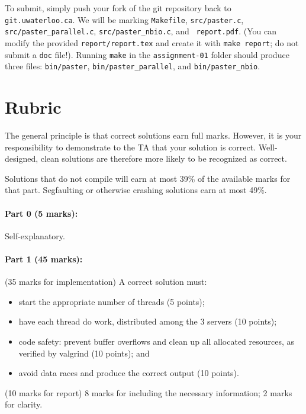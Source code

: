 \documentclass[letterpaper,10pt]{article}
\begin{document}
To submit, simply push your fork of the git repository back to {\tt git.uwaterloo.ca}.
We will
be marking {\tt Makefile}, {\tt src/paster.c}, {\tt
  src/paster\_parallel.c}, {\tt src/paster\_nbio.c}, and {\tt
  report.pdf}. (You can modify the provided {\tt report/report.tex}
and create it with {\tt make report}; do not submit a {\tt doc}
file!). Running {\tt make} in the {\tt assignment-01} folder should
produce three files: {\tt bin/paster}, {\tt bin/paster\_parallel}, and
{\tt bin/paster\_nbio}. 

\newpage

\section*{Rubric}
The general principle is that correct solutions earn full marks.
However, it is your responsibility to demonstrate to the TA
that your solution is correct. Well-designed, clean solutions 
are therefore more likely to be recognized as correct. 

Solutions that do not compile will earn at most 39\% of the available
marks for that part. Segfaulting or otherwise crashing solutions earn
at most 49\%.

\paragraph{Part 0 (5 marks):} Self-explanatory.

\paragraph{Part 1 (45 marks):} (35 marks for implementation) A correct solution must:
\begin{itemize}
\item start the appropriate number of threads (5 points);
\item have each thread do work, distributed among the 3 servers (10 points);
\item code safety: prevent buffer overflows and clean up all allocated resources, as verified by valgrind (10 points); and
\item avoid data races and produce the correct output (10 points).
\end{itemize}

\noindent (10 marks for report) 8 marks for including the necessary information; 2 marks
for clarity.
\end{document}
